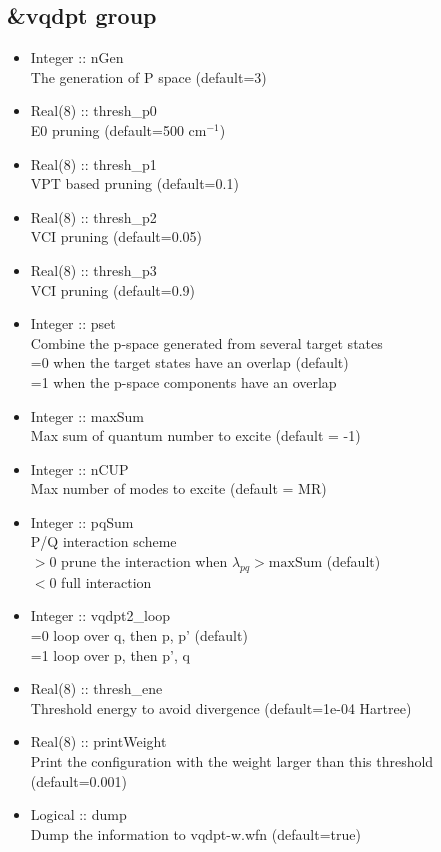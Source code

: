 \documentclass[a4paper,12pt]{article}
\begin{document}
\subsection{\&vqdpt group}
   \begin{itemize}
     \item Integer :: nGen \\
       The generation of P space (default=3)
     \item Real(8) :: thresh\_p0 \\
       E0 pruning (default=500 cm$^{-1}$)
     \item Real(8) :: thresh\_p1 \\
       VPT based pruning (default=0.1)
     \item Real(8) :: thresh\_p2 \\
       VCI pruning (default=0.05)
     \item Real(8) :: thresh\_p3 \\
       VCI pruning (default=0.9)
     \item Integer :: pset \\
       Combine the p-space generated from several target states \\
       =0 when the target states have an overlap (default) \\
       =1 when the p-space components have an overlap
     \item Integer :: maxSum \\
       Max sum of quantum number to excite (default = -1)
     \item Integer :: nCUP \\
       Max number of modes to excite (default = MR)
     \item Integer :: pqSum \\
       P/Q interaction scheme \\
       $> 0$ prune the interaction when $\lambda_{pq} > \mathrm{maxSum}$ (default) \\
       $< 0$ full interaction
     \item Integer :: vqdpt2\_loop \\
       =0 loop over q, then p, p' (default) \\
       =1 loop over p, then p', q
     \item Real(8) :: thresh\_ene \\
       Threshold energy to avoid divergence (default=1e-04 Hartree)
     \item Real(8) :: printWeight \\
       Print the configuration with the weight larger than this threshold (default=0.001)
     \item Logical :: dump \\
       Dump the information to vqdpt-w.wfn (default=true)
   \end{itemize}
\end{document}
